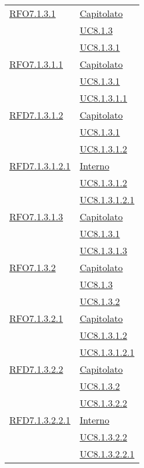\begin{longtable}{|>{\centering}m{5cm}|m{5cm}<{\centering}|}
\hyperlink{RFO7.1.3.1}{RFO7.1.3.1} & \hyperlink{Capitolato}{Capitolato}\\
& \hyperref[UC8.1.3]{UC8.1.3}\\
& \hyperref[UC8.1.3.1]{UC8.1.3.1}\\ \hline

\hyperlink{RFO7.1.3.1.1}{RFO7.1.3.1.1} & \hyperlink{Capitolato}{Capitolato}\\
& \hyperref[UC8.1.3.1]{UC8.1.3.1}\\
& \hyperref[UC8.1.3.1.1]{UC8.1.3.1.1}\\ \hline

\hyperlink{RFD7.1.3.1.2}{RFD7.1.3.1.2} & \hyperlink{Capitolato}{Capitolato}\\
& \hyperref[UC8.1.3.1]{UC8.1.3.1}\\
& \hyperref[UC8.1.3.1.2]{UC8.1.3.1.2}\\ \hline

\hyperlink{RFD7.1.3.1.2.1}{RFD7.1.3.1.2.1} & \hyperlink{Interno}{Interno}\\
& \hyperref[UC8.1.3.1.2]{UC8.1.3.1.2}\\
& \hyperref[UC8.1.3.1.2.1]{UC8.1.3.1.2.1}\\ \hline

\hyperlink{RFO7.1.3.1.3}{RFO7.1.3.1.3} & \hyperlink{Capitolato}{Capitolato}\\
& \hyperref[UC8.1.3.1]{UC8.1.3.1}\\
& \hyperref[UC8.1.3.1.3]{UC8.1.3.1.3}\\ \hline

\hyperlink{RFO7.1.3.2}{RFO7.1.3.2} & \hyperlink{Capitolato}{Capitolato}\\
& \hyperref[UC8.1.3]{UC8.1.3}\\
& \hyperref[UC8.1.3.2]{UC8.1.3.2}\\ \hline

\hyperlink{RFO7.1.3.2.1}{RFO7.1.3.2.1} & \hyperlink{Capitolato}{Capitolato}\\
& \hyperref[UC8.1.3.1.2]{UC8.1.3.1.2}\\
& \hyperref[UC8.1.3.1.2.1]{UC8.1.3.1.2.1}\\ \hline

\hyperlink{RFD7.1.3.2.2}{RFD7.1.3.2.2} & \hyperlink{Capitolato}{Capitolato}\\
& \hyperref[UC8.1.3.2]{UC8.1.3.2}\\
& \hyperref[UC8.1.3.2.2]{UC8.1.3.2.2}\\ \hline

\hyperlink{RFD7.1.3.2.2.1}{RFD7.1.3.2.2.1} & \hyperlink{Interno}{Interno}\\
& \hyperref[UC8.1.3.2.2]{UC8.1.3.2.2}\\
& \hyperref[UC8.1.3.2.2.1]{UC8.1.3.2.2.1}\\ \hline


\end{longtable}
